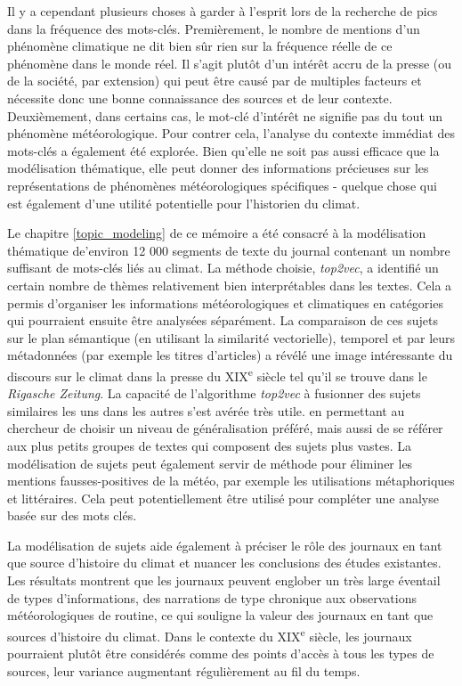 \documentclass[a4paper,twoside,12pt]{article}
\begin{document}
Il y a cependant plusieurs choses à garder à l'esprit lors de la recherche de pics dans la fréquence des mots-clés. Premièrement, le nombre de mentions d'un phénomène climatique ne dit bien sûr rien sur la fréquence réelle de ce phénomène dans le monde réel. Il s'agit plutôt d'un intérêt accru de la presse (ou de la société, par extension) qui peut être causé par de multiples facteurs et nécessite donc une bonne connaissance des sources et de leur contexte. Deuxièmement, dans certains cas, le mot-clé d'intérêt ne signifie pas du tout un phénomène météorologique. Pour contrer cela, l'analyse du contexte immédiat des mots-clés a également été explorée. Bien qu'elle ne soit pas aussi efficace que la modélisation thématique, elle peut donner des informations précieuses sur les représentations de phénomènes météorologiques spécifiques - quelque chose qui est également d'une utilité potentielle pour l'historien du climat.

Le chapitre \ref{topic_modeling} de ce mémoire a été consacré à la modélisation thématique de'environ 12 000 segments de texte du journal contenant un nombre suffisant de mots-clés liés au climat. La méthode choisie, \textit{top2vec}, a identifié un certain nombre de thèmes relativement bien interprétables dans les textes. Cela a permis d'organiser les informations météorologiques et climatiques en catégories qui pourraient ensuite être analysées séparément. La comparaison de ces sujets sur le plan sémantique (en utilisant la similarité vectorielle), temporel et par leurs métadonnées (par exemple les titres d'articles) a révélé une image intéressante du discours sur le climat dans la presse du XIX\textsuperscript{e} siècle tel qu'il se trouve dans le \textit{Rigasche Zeitung}. La capacité de l'algorithme \textit{top2vec} à fusionner des sujets similaires les uns dans les autres s'est avérée très utile. en permettant au chercheur de choisir un niveau de généralisation préféré, mais aussi de se référer aux plus petits groupes de textes qui composent des sujets plus vastes. La modélisation de sujets peut également servir de méthode pour éliminer les mentions fausses-positives de la météo, par exemple les utilisations métaphoriques et littéraires. Cela peut potentiellement être utilisé pour compléter une analyse basée sur des mots clés.

La modélisation de sujets aide également à préciser le rôle des journaux en tant que source d'histoire du climat et nuancer les conclusions des études existantes. Les résultats montrent que les journaux peuvent englober un très large éventail de types d'informations, des narrations de type chronique aux observations météorologiques de routine, ce qui souligne la valeur des journaux en tant que sources d'histoire du climat. Dans le contexte du XIX\textsuperscript{e} siècle, les journaux pourraient plutôt être considérés comme des points d'accès à tous les types de sources, leur variance augmentant régulièrement au fil du temps.
\end{document}
